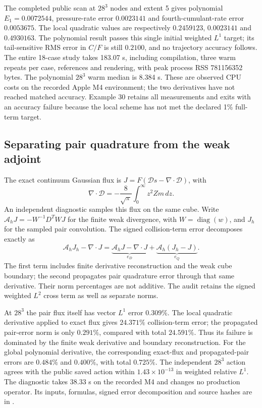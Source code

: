 \documentclass[11pt,letterpaper]{article}
\begin{document}
The completed public scan at $28^3$ nodes and extent 5 gives polynomial
$E_1=0.0072544$, pressure-rate error $0.0023141$ and fourth-cumulant-rate
error $0.0053675$. The local quadratic values are respectively
$0.2459123$, $0.0023141$ and $0.4930163$. The polynomial result passes
this single initial weighted $L^1$ target; its tail-sensitive RMS error
in $C/F$ is still $0.2100$, and no trajectory accuracy follows.
The entire 18-case study takes 183.07 s, including compilation,
three warm repeats per case, references and rendering, with peak process
RSS 781156352 bytes. The polynomial $28^3$ warm median is 8.384 s.
These are observed CPU costs on the recorded Apple M4 environment;
the two derivatives have not reached matched accuracy. Example 30
retains all measurements and exits with an accuracy failure because
the local scheme has not met the declared 1\% full-term target.

\subsection{Separating pair quadrature from the weak adjoint}
The exact continuum Gaussian flux is
$J=F(\mathcal D s-\nabla\cdot\mathcal D)$, with
\begin{equation}
 \nabla\cdot\mathcal D=-\frac8{\sqrt\pi}
 \int_0^\infty z^2 Zm\,dz.
\end{equation}
An independent diagnostic samples this flux on the same cube. Write
$\mathcal A_hJ=-W^{-1}D^TWJ$ for the finite weak divergence, with
$W=\operatorname{diag}(w)$, and $J_h$ for the sampled pair convolution.
The signed collision-term error decomposes exactly as
\begin{equation}
 \mathcal A_hJ_h-\nabla\cdot J
 =\underbrace{\mathcal A_hJ-\nabla\cdot J}_{e_D}
 +\underbrace{\mathcal A_h(J_h-J)}_{e_Q}.
\end{equation}
The first term includes finite derivative reconstruction and the weak
cube boundary; the second propagates pair quadrature error through that
same derivative. Their norm percentages are not additive. The audit
retains the signed weighted $L^2$ cross term as well as separate norms.

At $28^3$ the pair flux itself has vector $L^1$ error $0.309\%$.
The local quadratic derivative applied to exact flux gives $24.371\%$
collision-term error; the propagated pair-error norm is only $0.291\%$,
compared with total $24.591\%$. Thus its failure is dominated by the
finite weak derivative and boundary reconstruction. For the global
polynomial derivative, the corresponding exact-flux and propagated-pair
errors are $0.484\%$ and $0.400\%$, with total $0.725\%$.
The independent $28^3$ action agrees with the public saved action within
$1.43\times10^{-13}$ in weighted relative $L^1$. The diagnostic takes
38.33 s on the recorded M4 and changes no production operator. Its
inputs, formulas, signed error decomposition and source hashes are in
.
\end{document}
